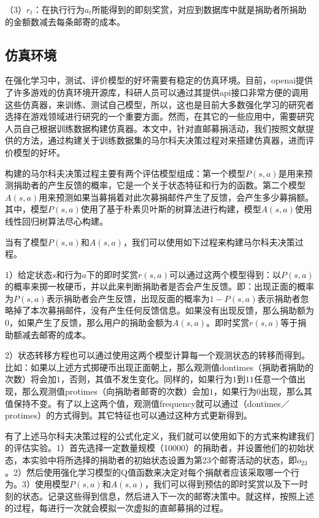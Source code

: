 （3）$r_{t}$：在执行行为$a_{t}$所能得到的即刻奖赏，对应到数据库中就是捐助者所捐助的金额数减去每条邮寄的成本。

\subsection{仿真环境}
在强化学习中，测试、评价模型的好坏需要有稳定的仿真环境。目前，openai提供了许多游戏的仿真环境开源库，科研人员可以通过其提供api接口非常方便的调用这些仿真器，来训练、测试自己模型，所以，这也是目前大多数强化学习的研究者选择在游戏领域进行研究的一个重要方面。然而，在其它的一些应用中，需要研究人员自己根据训练数据构建仿真器。本文中，针对直邮募捐活动，我们按照文献\citep{pednault2002sequential}提供的方法，通过构建关于训练数据集的马尔科夫决策过程对来搭建仿真器，进而评价模型的好坏。

构建的马尔科夫决策过程主要有两个评估模型组成：第一个模型$P(s,a)$是用来预测捐助者的产生反馈的概率，它是一个关于状态特征和行为的函数。第二个模型$A(s,a)$用来预测如果当募捐着对此次募捐邮件产生了反馈，会产生多少募捐额。其中，模型$P(s,a)$使用了基于朴素贝叶斯的树算法进行构建，模型$A(s,a)$使用线性回归树算法尽心构建。

当有了模型$P(s,a)$和$A(s,a)$，我们可以使用如下过程来构建马尔科夫决策过程。

1）给定状态$s$和行为$a$下的即时奖赏$r(s,a)$可以通过这两个模型得到：以$P(s,a)$的概率来掷一枚硬币，并以此来判断捐助者是否会产生反馈。即：出现正面的概率为$P(s,a)$表示捐助者会产生反馈，出现反面的概率为$1-P(s,a)$表示捐助者忽略掉了本次募捐邮件，没有产生任何反馈信息。如果没有出现反馈，那么捐助额为$0$，如果产生了反馈，那么用户的捐助金额为$A(s,a)$。即时奖赏$r(s,a)$等于捐助额减去邮寄的成本。

2）状态转移方程也可以通过使用这两个模型计算每一个观测状态的转移而得到。比如：如果以上述方式掷硬币出现正面朝上，那么观测值dontimes（捐助者捐助的次数）将会加$1$，否则，其值不发生变化。同样的，如果行为$1$到$11$任意一个值出现，那么观测值protimes（向捐助者邮寄的次数）会加$1$，如果行为$0$出现，那么其值保持不变。有了以上这两个值，观测值frequency就可以通过（dontimes／protimes）的方式得到。其它特征也可以通过这种方式更新得到。

有了上述马尔科夫决策过程的公式化定义，我们就可以使用如下的方式来构建我们的评估实验。1）首先选择一定数量规模（10000）的捐助者，并设置他们的初始状态，本实验中将所选择的捐助者的初始状态设置为第23个邮寄活动的状态，即$o_{23}$。2）然后使用强化学习模型的Q值函数来决定对每个捐献者应该采取哪一个行为。3）使用模型$P(s,a)$和$A(s,a)$，我们可以得到预估的即时奖赏以及下一时刻的状态。记录这些得到信息，然后进入下一次的邮寄决策中。就这样，按照上述的过程，每进行一次就会模拟一次虚拟的直邮募捐的过程。

